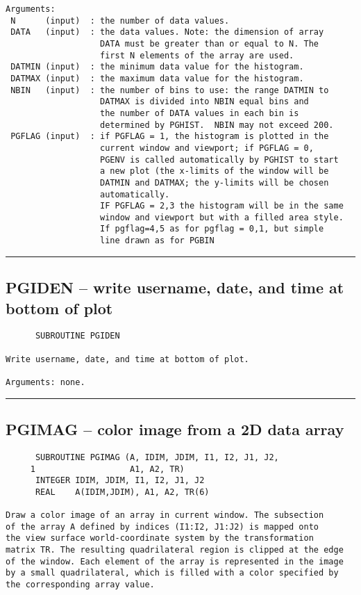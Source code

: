 {\begin{verbatim}
Arguments:
 N      (input)  : the number of data values.
 DATA   (input)  : the data values. Note: the dimension of array
                   DATA must be greater than or equal to N. The
                   first N elements of the array are used.
 DATMIN (input)  : the minimum data value for the histogram.
 DATMAX (input)  : the maximum data value for the histogram.
 NBIN   (input)  : the number of bins to use: the range DATMIN to
                   DATMAX is divided into NBIN equal bins and
                   the number of DATA values in each bin is
                   determined by PGHIST.  NBIN may not exceed 200.
 PGFLAG (input)  : if PGFLAG = 1, the histogram is plotted in the
                   current window and viewport; if PGFLAG = 0,
                   PGENV is called automatically by PGHIST to start
                   a new plot (the x-limits of the window will be
                   DATMIN and DATMAX; the y-limits will be chosen
                   automatically.
                   IF PGFLAG = 2,3 the histogram will be in the same
                   window and viewport but with a filled area style.
                   If pgflag=4,5 as for pgflag = 0,1, but simple
                   line drawn as for PGBIN

\end{verbatim}
\hrule


\subsection*{PGIDEN -- write username, date, and time at bottom of plot }
\begin{verbatim}
      SUBROUTINE PGIDEN

Write username, date, and time at bottom of plot.

Arguments: none.
\end{verbatim}
\hrule


\subsection*{PGIMAG -- color image from a 2D data array }
\begin{verbatim}
      SUBROUTINE PGIMAG (A, IDIM, JDIM, I1, I2, J1, J2,
     1                   A1, A2, TR)
      INTEGER IDIM, JDIM, I1, I2, J1, J2
      REAL    A(IDIM,JDIM), A1, A2, TR(6)

Draw a color image of an array in current window. The subsection
of the array A defined by indices (I1:I2, J1:J2) is mapped onto
the view surface world-coordinate system by the transformation
matrix TR. The resulting quadrilateral region is clipped at the edge
of the window. Each element of the array is represented in the image
by a small quadrilateral, which is filled with a color specified by
the corresponding array value.


\end{verbatim}}
